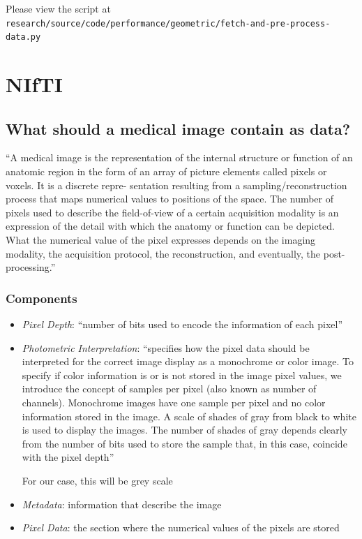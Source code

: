 \documentclass[11pt]{article}
\begin{document}
Please view the script at \texttt{research/source/code/performance/geometric/fetch-and-pre-process-data.py}

\section{NIfTI}

\subsection{What should a medical image contain as data?}

``A medical image is the representation of the internal structure
or function of an anatomic region in the form of an array of
picture elements called pixels or voxels. It is a discrete repre-
sentation resulting from a sampling/reconstruction process
that maps numerical values to positions of the space. The
number of pixels used to describe the field-of-view of a certain
acquisition modality is an expression of the detail with which
the anatomy or function can be depicted. What the numerical
value of the pixel expresses depends on the imaging modality,
the acquisition protocol, the reconstruction, and eventually,
the post-processing.''~\cite{file-formats}

\subsubsection{Components}

\begin{itemize}
    \item \textit{Pixel Depth}: ``number of bits used to encode the information of each pixel''~\cite{file-formats}
    \item \textit{Photometric Interpretation}:  ``specifies how the pixel data
    should be interpreted for the correct image display as a 
    monochrome or color image. To specify if color information is or is
    not stored in the image pixel values, we introduce the concept
    of samples per pixel (also known as number of channels).
    Monochrome images have one sample per pixel and no color
    information stored in the image. A scale of shades of gray
    from black to white is used to display the images. The number
    of shades of gray depends clearly from the number of bits used
    to store the sample that, in this case, coincide with the pixel
    depth''~\cite{file-formats}

    For our case, this will be grey scale 

    \item \textit{Metadata}: information that describe the image
    \item \textit{Pixel Data}: the section where the numerical values of the pixels are stored
\end{itemize}
\end{document}
